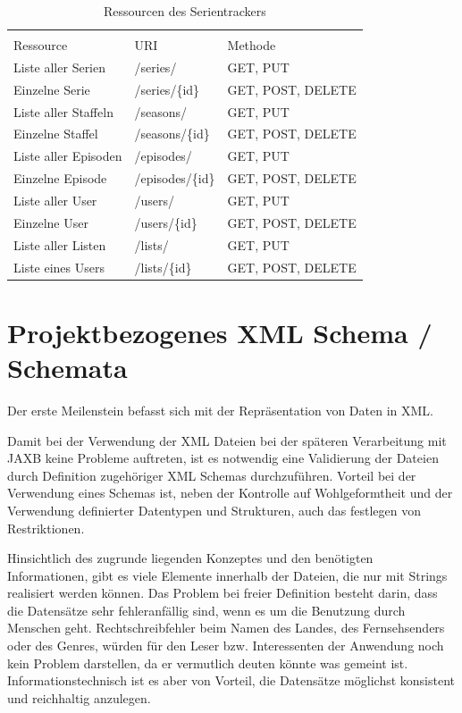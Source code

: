 \documentclass[a4paper]{article}
\begin{document}
\begin{table}[H]
\caption{Ressourcen des Serientrackers}  %

\centering %
\begin{tabular}{l l l} %
\hline\hline %
 \\ [-0.5ex]
 Ressource & URI & Methode
\\ [1ex]
\hline %
Liste aller Serien & /series/ & GET, PUT \\[1ex]
Einzelne Serie & /series/\{id\} & GET, POST, DELETE\\[1ex]
Liste aller Staffeln & /seasons/ & GET, PUT \\[1ex]
Einzelne Staffel & /seasons/\{id\} & GET, POST, DELETE\\[1ex]
Liste aller Episoden & /episodes/ & GET, PUT \\[1ex]
Einzelne Episode & /episodes/\{id\} & GET, POST, DELETE\\[1ex]
Liste aller User & /users/ & GET, PUT \\[1ex]
Einzelne User & /users/\{id\} & GET, POST, DELETE\\[1ex]
Liste aller Listen & /lists/ & GET, PUT\\[1ex]
Liste eines Users & /lists/\{id\} & GET, POST, DELETE\\[1ex]
\hline %
\end{tabular}
\label{tab:PPer}
\end{table}

\newpage

\section{Projektbezogenes XML Schema / Schemata}
Der erste Meilenstein befasst sich mit der Repräsentation von Daten in XML.

Damit bei der Verwendung der XML Dateien bei der späteren Verarbeitung mit JAXB keine Probleme auftreten,
ist es notwendig eine Validierung der Dateien durch Definition zugehöriger XML Schemas durchzuführen.
Vorteil bei der Verwendung eines Schemas ist, neben der Kontrolle auf Wohlgeformtheit und der Verwendung
definierter Datentypen und Strukturen, auch das festlegen von Restriktionen.

Hinsichtlich des zugrunde liegenden Konzeptes und den benötigten Informationen, gibt es viele Elemente
innerhalb der Dateien, die nur mit Strings realisiert werden können. Das Problem bei freier Definition
besteht darin, dass die Datensätze sehr fehleranfällig sind, wenn es um die Benutzung durch Menschen geht.
Rechtschreibfehler beim Namen des Landes, des Fernsehsenders oder des Genres, würden für den Leser bzw.
Interessenten der Anwendung noch kein Problem darstellen, da er vermutlich deuten könnte was gemeint ist.
Informationstechnisch ist es aber von Vorteil, die Datensätze möglichst konsistent und reichhaltig anzulegen.
\end{document}

